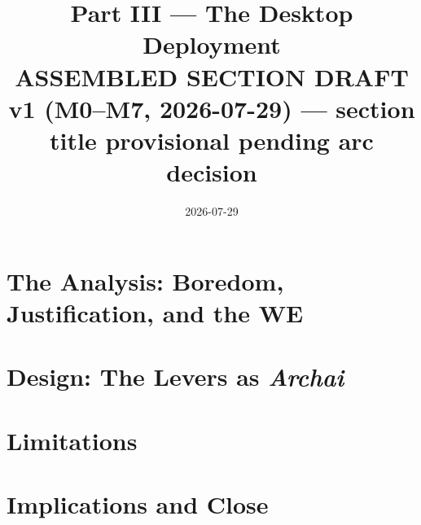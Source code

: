 \documentclass{article}
\title{Part III --- The Desktop Deployment \\
  \large ASSEMBLED SECTION DRAFT v1 (M0--M7, 2026-07-29) ---
  section title provisional pending arc decision}
\author{}
\date{2026-07-29}
\begin{document}
\maketitle









\section{The Analysis: Boredom, Justification, and the WE}


\section{Design: The Levers as \textit{Archai}}


\section{Limitations}


\section{Implications and Close}

\end{document}
